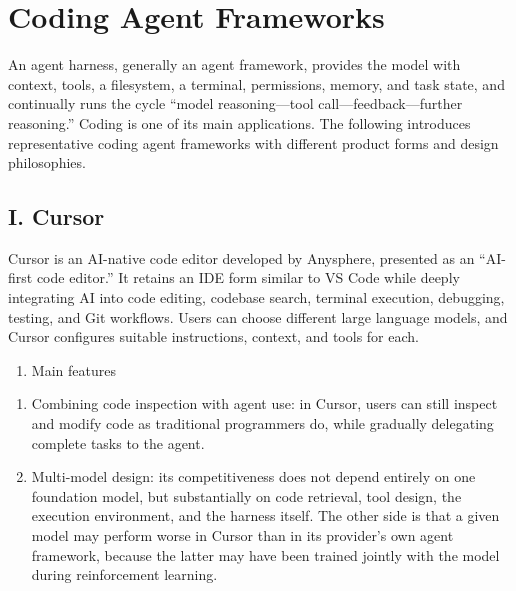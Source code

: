\setcounter{section}{4}

\hypertarget{coding-agent-frameworks}{%
\section{Coding Agent Frameworks}\label{coding-agent-frameworks}}

An agent harness, generally an agent framework, provides the model with context, tools, a filesystem, a terminal, permissions, memory, and task state, and continually runs the cycle ``model reasoning---tool call---feedback---further reasoning.'' Coding is one of its main applications. The following introduces representative coding agent frameworks with different product forms and design philosophies.

\hypertarget{i.-cursor}{%
\subsection{I. Cursor}\label{i.-cursor}}

Cursor is an AI-native code editor developed by Anysphere, presented as an ``AI-first code editor.'' It retains an IDE form similar to VS Code while deeply integrating AI into code editing, codebase search, terminal execution, debugging, testing, and Git workflows. Users can choose different large language models, and Cursor configures suitable instructions, context, and tools for each.

\begin{enumerate}
\def\labelenumi{(\Roman{enumi})}
\tightlist
\item
  Main features
\end{enumerate}

\begin{enumerate}
\def\labelenumi{\arabic{enumi}.}
\item
  Combining code inspection with agent use: in Cursor, users can still inspect and modify code as traditional programmers do, while gradually delegating complete tasks to the agent.
\item
  Multi-model design: its competitiveness does not depend entirely on one foundation model, but substantially on code retrieval, tool design, the execution environment, and the harness itself. The other side is that a given model may perform worse in Cursor than in its provider's own agent framework, because the latter may have been trained jointly with the model during reinforcement learning.
\end{enumerate}

